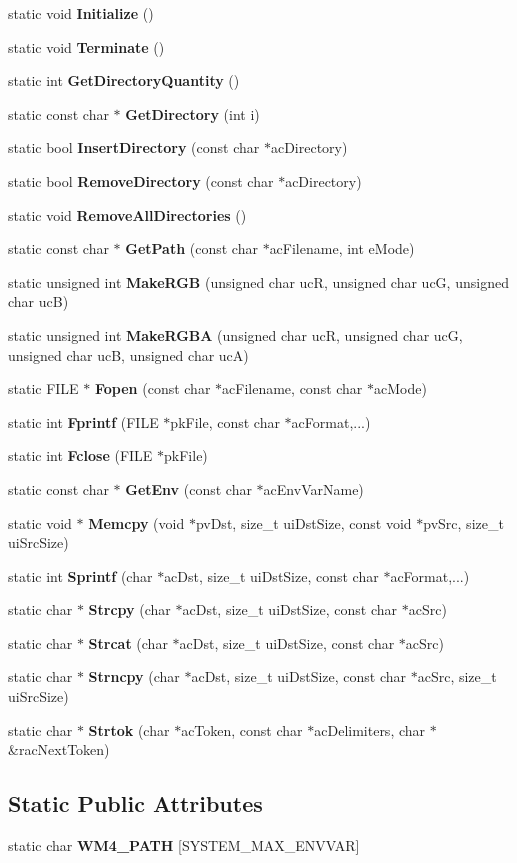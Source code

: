 \begin{CompactItemize}
static void {\bf Initialize} ()
\item 
static void {\bf Terminate} ()
\item 
static int {\bf Get\-Directory\-Quantity} ()
\item 
static const char $\ast$ {\bf Get\-Directory} (int i)
\item 
static bool {\bf Insert\-Directory} (const char $\ast$ac\-Directory)
\item 
static bool {\bf Remove\-Directory} (const char $\ast$ac\-Directory)
\item 
static void {\bf Remove\-All\-Directories} ()
\item 
static const char $\ast$ {\bf Get\-Path} (const char $\ast$ac\-Filename, int e\-Mode)
\item 
static unsigned int {\bf Make\-RGB} (unsigned char uc\-R, unsigned char uc\-G, unsigned char uc\-B)
\item 
static unsigned int {\bf Make\-RGBA} (unsigned char uc\-R, unsigned char uc\-G, unsigned char uc\-B, unsigned char uc\-A)
\item 
static FILE $\ast$ {\bf Fopen} (const char $\ast$ac\-Filename, const char $\ast$ac\-Mode)
\item 
static int {\bf Fprintf} (FILE $\ast$pk\-File, const char $\ast$ac\-Format,...)
\item 
static int {\bf Fclose} (FILE $\ast$pk\-File)
\item 
static const char $\ast$ {\bf Get\-Env} (const char $\ast$ac\-Env\-Var\-Name)
\item 
static void $\ast$ {\bf Memcpy} (void $\ast$pv\-Dst, size\_\-t ui\-Dst\-Size, const void $\ast$pv\-Src, size\_\-t ui\-Src\-Size)
\item 
static int {\bf Sprintf} (char $\ast$ac\-Dst, size\_\-t ui\-Dst\-Size, const char $\ast$ac\-Format,...)
\item 
static char $\ast$ {\bf Strcpy} (char $\ast$ac\-Dst, size\_\-t ui\-Dst\-Size, const char $\ast$ac\-Src)
\item 
static char $\ast$ {\bf Strcat} (char $\ast$ac\-Dst, size\_\-t ui\-Dst\-Size, const char $\ast$ac\-Src)
\item 
static char $\ast$ {\bf Strncpy} (char $\ast$ac\-Dst, size\_\-t ui\-Dst\-Size, const char $\ast$ac\-Src, size\_\-t ui\-Src\-Size)
\item 
static char $\ast$ {\bf Strtok} (char $\ast$ac\-Token, const char $\ast$ac\-Delimiters, char $\ast$\&rac\-Next\-Token)
\end{CompactItemize}
\subsection*{Static Public Attributes}
\begin{CompactItemize}
\item 
static char {\bf WM4\_\-PATH} [SYSTEM\_\-MAX\_\-ENVVAR]
\end{CompactItemize}


